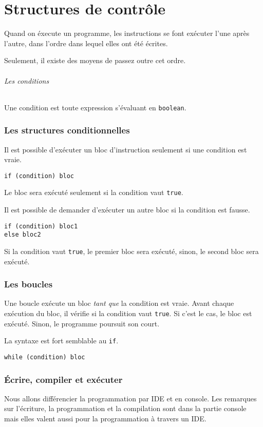 \part{Structures de contrôle}
Quand on éxecute un programme, les instructions se font exécuter l'une après
l'autre, dans l'ordre dans lequel elles ont été écrites.

Seulement, il existe des moyens de passez outre cet ordre.

\paragraph{Les conditions}
Une condition est toute expression s'évaluant en \verb|boolean|.

\section{Les structures conditionnelles}
Il est possible d'exécuter un bloc d'instruction seulement si une condition
est vraie.
\begin{lstlisting}
if (condition) bloc
\end{lstlisting}
Le bloc sera exécuté seulement si la condition vaut \verb|true|.

Il est possible de demander d'exécuter un autre bloc si la condition est fausse.
\begin{lstlisting}
if (condition) bloc1
else bloc2
\end{lstlisting}
Si la condition vaut \verb|true|, le premier bloc sera exécuté, sinon, le
second bloc sera exécuté.

\section{Les boucles}
Une boucle exécute un bloc \emph{tant que} la condition est vraie.
Avant chaque exécution du bloc, il vérifie si la condition vaut \verb|true|.
Si c'est le cas, le bloc est exécuté.
Sinon, le programme poursuit son court.

La syntaxe est fort semblable au \verb|if|.
\begin{lstlisting}
while (condition) bloc
\end{lstlisting}

\appendix
\section{Écrire, compiler et exécuter}
Nous allons différencier la programmation par IDE et en console.
Les remarques sur l'écriture, la programmation et la compilation
sont dans la partie console mais elles valent aussi pour la
programmation à travers un IDE.

